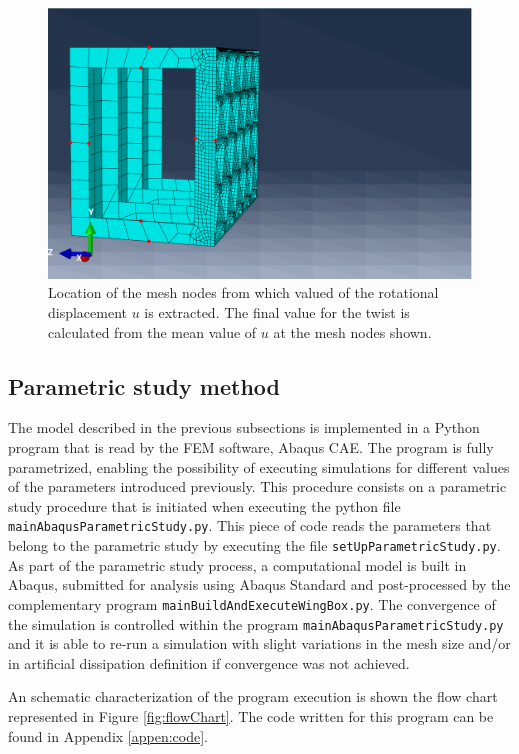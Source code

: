     \begin{figure}[!htpb]
      \centering
      \includegraphics[width=0.6 \textwidth]{figures/model/pointsToEvaluateTwist}
      \caption[Location of the mesh nodes from which valued of the rotational displacement $u$ is extracted]{Location of the mesh nodes from which valued of the rotational displacement $u$ is extracted. The final value for the twist is calculated from the mean value of $u$ at the mesh nodes shown.}
      \label{fig:pointsToEvaluateTwist}
    \end{figure}
  
  \subsection{Parametric study method} \label{subsec:parametricStudy_computationalModel}

    The model described in the previous subsections is implemented in a Python program that is read by the FEM software, Abaqus CAE. The program is fully parametrized, enabling the possibility of executing simulations for different values of the parameters introduced previously. This procedure consists on a parametric study procedure that is initiated when executing the python file \texttt{mainAbaqusParametricStudy.py}. This piece of code reads the parameters that belong to the parametric study by executing the file \texttt{setUpParametricStudy.py}. As part of the parametric study process, a computational model is built in Abaqus, submitted for analysis using Abaqus Standard and post-processed by the complementary program \texttt{mainBuildAndExecuteWingBox.py}. The convergence of the simulation is controlled within the program \texttt{mainAbaqusParametricStudy.py} and it is able to re-run a simulation with slight variations in the mesh size and/or in artificial dissipation definition if convergence was not achieved. 

    An schematic characterization of the program execution is shown the flow chart represented in Figure \ref{fig:flowChart}. The code written for this program can be found in Appendix \ref{appen:code}. 

